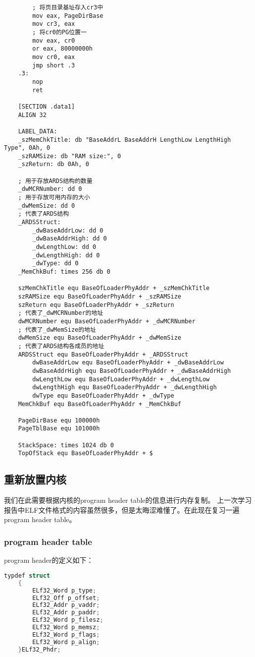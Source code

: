 \documentclass[a4paper,left=2.5cm,right=2.5cm,11pt]{article}
\begin{document}
\begin{lstlisting}
		; 将页目录基址存入cr3中
		mov eax, PageDirBase
		mov cr3, eax
		; 将cr0的PG位置一
		mov eax, cr0
		or eax, 80000000h
		mov cr0, eax
		jmp short .3
	.3:
		nop
		ret

	[SECTION .data1]
	ALIGN 32

	LABEL_DATA:
	_szMemChkTitle: db "BaseAddrL BaseAddrH LengthLow LengthHigh   Type", 0Ah, 0
	_szRAMSize: db "RAM size:", 0
	_szReturn: db 0Ah, 0

	; 用于存放ARDS结构的数量
	_dwMCRNumber: dd 0
	; 用于存放可用内存的大小
	_dwMemSize: dd 0
	; 代表了ARDS结构
	_ARDSStruct:
		_dwBaseAddrLow: dd 0
		_dwBaseAddrHigh: dd 0
		_dwLengthLow: dd 0
		_dwLengthHigh: dd 0
		_dwType: dd 0
	_MemChkBuf: times 256 db 0

	szMemChkTitle equ BaseOfLoaderPhyAddr + _szMemChkTitle
	szRAMSize equ BaseOfLoaderPhyAddr + _szRAMSize
	szReturn equ BaseOfLoaderPhyAddr + _szReturn
	; 代表了_dwMCRNumber的地址
	dwMCRNumber equ BaseOfLoaderPhyAddr + _dwMCRNumber
	; 代表了_dwMemSize的地址
	dwMemSize equ BaseOfLoaderPhyAddr + _dwMemSize
	; 代表了ARDS结构各成员的地址
	ARDSStruct equ BaseOfLoaderPhyAddr + _ARDSStruct
		dwBaseAddrLow equ BaseOfLoaderPhyAddr + _dwBaseAddrLow
		dwBaseAddrHigh equ BaseOfLoaderPhyAddr + _dwBaseAddrHigh
		dwLengthLow equ BaseOfLoaderPhyAddr + _dwLengthLow
		dwLengthHigh equ BaseOfLoaderPhyAddr + _dwLengthHigh
		dwType equ BaseOfLoaderPhyAddr + _dwType
	MemChkBuf equ BaseOfLoaderPhyAddr + _MemChkBuf

	PageDirBase equ 100000h
	PageTblBase equ 101000h

	StackSpace: times 1024 db 0
	TopOfStack equ BaseOfLoaderPhyAddr + $
	\end{lstlisting}

\subsection{重新放置内核}
	我们在此需要根据内核的program header table的信息进行内存复制。
	上一次学习报告中ELF文件格式的内容虽然很多，但是太晦涩难懂了。在此现在复习一遍program header table。

\subsubsection{program header table}
	program header的定义如下：
	\begin{lstlisting}[language = C]
	typdef struct
	{
		ELf32_Word p_type;
		ELf32_Off p_offset;
		ELf32_Addr p_vaddr;
		ELf32_Addr p_paddr;
		ELf32_Word p_filesz;
		ELf32_Word p_memsz;
		ELf32_Word p_flags;
		ELf32_Word p_align;
	}ELf32_Phdr;
	\end{lstlisting}
\end{document}
